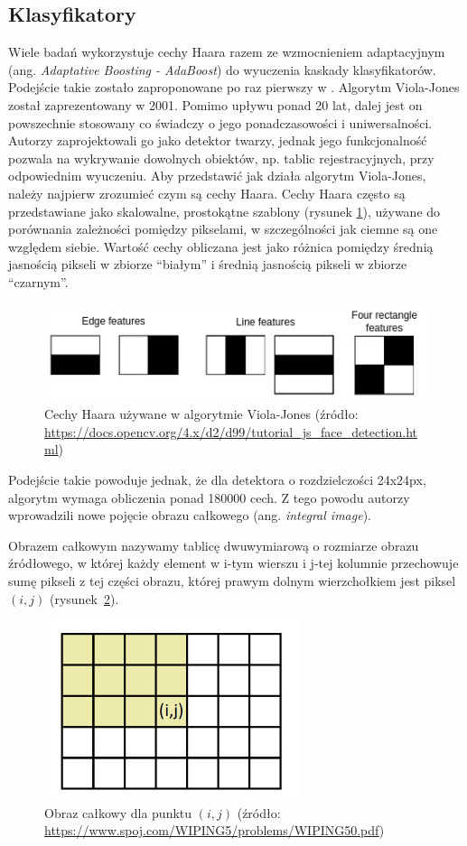 \subsection{Klasyfikatory}
Wiele badań wykorzystuje cechy Haara razem ze wzmocnieniem adaptacyjnym (ang. \textit{Adaptative Boosting - AdaBoost}) do wyuczenia kaskady klasyfikatorów.
Podejście takie zostało zaproponowane po raz pierwszy w \cite{990517}.
Algorytm Viola-Jones został zaprezentowany w 2001.
Pomimo upływu ponad 20 lat, dalej jest on powszechnie stosowany co świadczy o jego ponadczasowości i uniwersalności.
Autorzy zaprojektowali go jako detektor twarzy, jednak jego funkcjonalność pozwala na wykrywanie dowolnych obiektów, np. tablic rejestracyjnych, przy odpowiednim wyuczeniu.
Aby przedstawić jak działa algorytm Viola-Jones, należy najpierw zrozumieć czym są cechy Haara.
Cechy Haara często są przedstawiane jako skalowalne, prostokątne szablony (rysunek \ref{fig:haar_feats}), używane do porównania zależności pomiędzy pikselami, w szczególności jak ciemne są one względem siebie.
Wartość cechy obliczana jest jako różnica pomiędzy średnią jasnością pikseli w zbiorze ``białym'' i średnią jasnością pikseli w zbiorze ``czarnym''.
\begin{figure}[!ht]
    \centering
    \includegraphics[scale=0.6]{Pictures/haar_feats}
    \caption{Cechy Haara używane w algorytmie Viola-Jones (źródło: \url{https://docs.opencv.org/4.x/d2/d99/tutorial_js_face_detection.html})}
    \label{fig:haar_feats}
\end{figure}
\FloatBarrier
Podejście takie powoduje jednak, że dla detektora o rozdzielczości 24x24px, algorytm wymaga obliczenia ponad 180000 cech.
Z tego powodu autorzy wprowadzili nowe pojęcie obrazu całkowego (ang. \textit{integral image}).
\begin{theorem}
    Obrazem całkowym nazywamy tablicę dwuwymiarową o rozmiarze obrazu źródłowego, w której każdy element w i-tym wierszu i j-tej kolumnie przechowuje sumę pikseli z tej części obrazu, której prawym dolnym wierzchołkiem jest piksel $(i, j)$ (rysunek~\ref{fig:ii_cords}).
\end{theorem}
\begin{figure}[!htb]
    \centering
    \includegraphics[scale=0.6]{Pictures/ii_cords}
    \caption{Obraz całkowy dla punktu $(i, j)$ (źródło: \url{https://www.spoj.com/WIPING5/problems/WIPING50.pdf})}
    \label{fig:ii_cords}
\end{figure}
